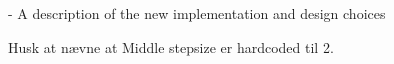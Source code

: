 - A description of the new implementation and design choices

Husk at nævne at Middle stepsize er hardcoded til 2.